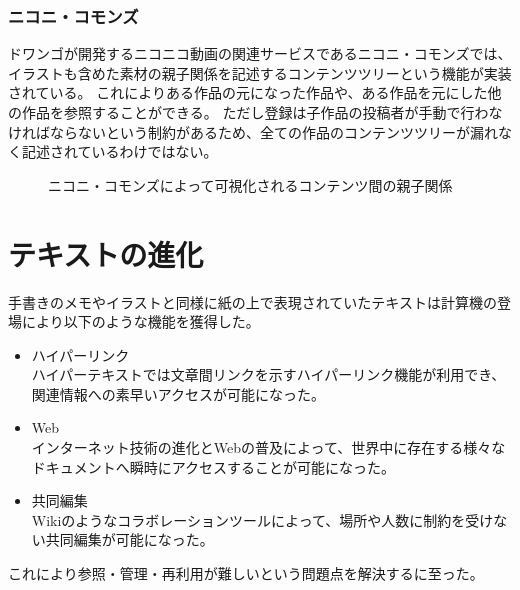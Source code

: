 \subsubsection{ニコニ・コモンズ}

ドワンゴが開発するニコニコ動画の関連サービスであるニコニ・コモンズでは、イラストも含めた素材の親子関係を記述するコンテンツツリーという機能が実装されている。
これによりある作品の元になった作品や、ある作品を元にした他の作品を参照することができる。
ただし登録は子作品の投稿者が手動で行わなければならないという制約があるため、全ての作品のコンテンツツリーが漏れなく記述されているわけではない。

\begin{figure}[htbp]
    \begin{center}
         \end{center}
    \caption{ニコニ・コモンズによって可視化されるコンテンツ間の親子関係}
\end{figure}


\section{テキストの進化}
手書きのメモやイラストと同様に紙の上で表現されていたテキストは計算機の登場により以下のような機能を獲得した。
\begin{itemize}
    \item ハイパーリンク\\
    ハイパーテキストでは文章間リンクを示すハイパーリンク機能が利用でき、関連情報への素早いアクセスが可能になった。
    \item Web\\
    インターネット技術の進化とWebの普及によって、世界中に存在する様々なドキュメントへ瞬時にアクセスすることが可能になった。
    \item 共同編集\\
    Wikiのようなコラボレーションツールによって、場所や人数に制約を受けない共同編集が可能になった。
\end{itemize}
これにより参照・管理・再利用が難しいという問題点を解決するに至った。

